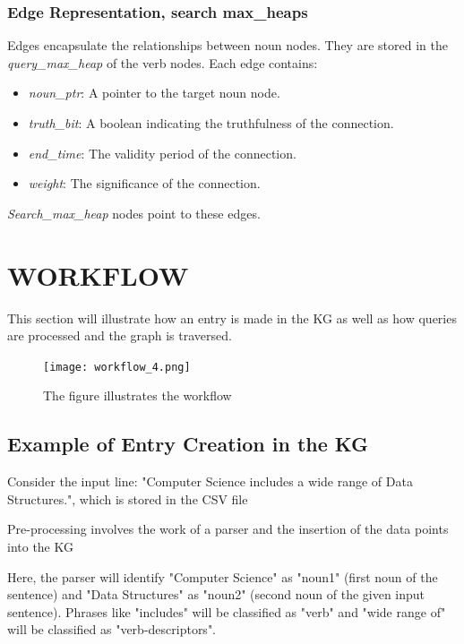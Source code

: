 \documentclass[conference]{IEEEtran}
\begin{document}
\subsubsection{\textbf{Edge Representation, search max\_heaps}}
Edges encapsulate the relationships between noun nodes. They are stored in the \textit{query\_max\_heap} of the verb nodes. Each edge contains:
\begin{itemize}

    \item \textit{noun\_ptr}: A pointer to the target noun node.
    \item \textit{truth\_bit}: A boolean indicating the truthfulness of the connection.
    \item \textit{end\_time}: The validity period of the connection.
    \item \textit{weight}: The significance of the connection.
\end{itemize}

\textit{Search\_max\_heap} nodes point to these edges.


\section{WORKFLOW}


This section will illustrate how an entry is made in the KG as well as how queries are processed and the graph is traversed.

\begin{figure}[htbp]
\centerline{\texttt{[image: workflow\_4.png]}}
\caption{The figure illustrates the workflow}
\label{fig}
\end{figure}
\subsection{\textbf{Example of Entry Creation in the KG}}

Consider the input line: "Computer Science includes a wide range of Data Structures.", which is stored in the CSV file

Pre-processing involves the work of a parser and the insertion of the data points into the KG

Here, the parser will identify "Computer Science" as "noun1" (first noun of the sentence)
and "Data Structures" as "noun2" (second noun of the given input sentence).
Phrases like "includes" will be classified as "verb" and "wide range of" will be classified as "verb-descriptors".
\end{document}
